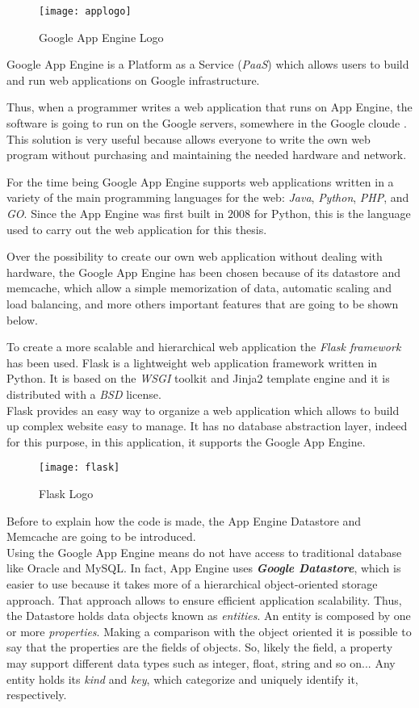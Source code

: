 \begin{figure}[h]
	\centering
	\texttt{[image: applogo]}
	\caption{Google App Engine Logo}
	\label{Fig:applogo}	
\end{figure}

Google App Engine is a Platform as a Service (\textit{PaaS}) which allows users to build and run web applications on Google  infrastructure.

Thus, when a programmer writes a web application that runs on App Engine, the software is going to run on the Google servers, somewhere in the Google cloude \cite{UGAE}. This solution is very useful because allows everyone to write the own web program without purchasing and maintaining the needed hardware and network.

For the time being Google App Engine supports web applications written in a variety of the main programming languages for the web: \textit{Java}, \textit{Python}, \textit{PHP}, and \textit{GO}. Since the App Engine was first built in $2008$ for Python, this is the language used to carry out the web application for this thesis.

Over the possibility to create our own web application without dealing with hardware, the Google App Engine has been chosen because of its datastore and memcache, which allow a simple memorization of data, automatic scaling and load balancing, and more others important features that are going to be shown below.

To create a more scalable and hierarchical web application the \textit{Flask framework} has been used. Flask is a lightweight web application framework written in Python. It is based on the \textit{WSGI} toolkit and Jinja2 template engine and it is distributed with a \textit{BSD} license.\\ Flask provides an easy way to organize a web application which allows to build up complex website easy to manage. It has no database abstraction layer, indeed for this purpose, in this application, it supports the Google App Engine.

\begin{figure}[h]
	\centering
	\texttt{[image: flask]}
	\caption{Flask Logo}
	\label{Fig:flasklogo}	
\end{figure}

Before to explain how the code is made, the App Engine Datastore and Memcache are going to be introduced.\\
Using  the Google App Engine means do not have access to traditional database like Oracle and MySQL. In fact, App Engine uses \textit{\textbf{Google Datastore}}, which is easier to use because it takes more of a hierarchical object-oriented storage approach. That approach allows to ensure efficient application scalability.
Thus, the Datastore holds data objects known as \textit{entities}. An entity is composed by one or more \textit{properties}. Making a comparison with the object oriented it is possible to say that the properties are the fields of objects. So, likely the field, a property may support different data types such as integer, float, string and so on... Any entity holds its \textit{kind} and \textit{key}, which categorize and uniquely identify it, respectively. 

